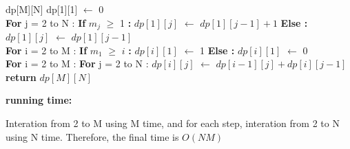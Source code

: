 \documentclass[12pt]{article}
\begin{document}
\begin{algorithm}
\begin{algorithmic}
\State dp[M][N]
\State dp[1][1] $\leftarrow$ 0
\\
\State \textbf{For} j = 2 to N :
\State \hspace{0.4cm} \textbf{If} $m_j$ $\geq$ 1 \textbf{:}
\State \hspace{0.8cm} $dp[1][j]$ $\leftarrow$ $dp[1][j - 1] + 1$
\State \hspace{0.4cm} \textbf{Else :}
\State \hspace{0.8cm} $dp[1][j]$ $\leftarrow$ $dp[1][j - 1]$
\\
\State \textbf{For} i = 2 to M :
\State \hspace{0.4cm} \textbf{If} $m_1$ $\geq$ $i$ \textbf{:}
\State \hspace{0.8cm} $dp[i][1]$ $\leftarrow$ 1
\State \hspace{0.4cm} \textbf{Else :}
\State \hspace{0.8cm} $dp[i][1]$ $\leftarrow$ 0
\\
\State \textbf{For} i = 2 to M :
\State \hspace{0.4cm} \textbf{For} j = 2 to N :
\State \hspace{0.8cm} $dp[i][j]$ $\leftarrow$ $dp[i - 1][j] + dp[i][j - 1]$
\\
\State \textbf{return} $dp[M][N]$
\end{algorithmic}
\end{algorithm}


\textbf{running time:} \par
Interation from 2 to M using M time, and for each step, interation from 2 to N using N time.
Therefore, the final time is $O(N M)$
\end{document}

